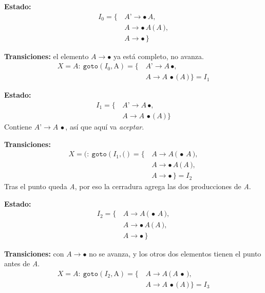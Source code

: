 \documentclass[12pt,letterpaper]{article}
\newcommand{\nt}[1]{\textit{#1}}
\newcommand{\tk}[1]{\texttt{#1}}
\newcommand{\tx}[1]{\text{#1}}
\begin{document}
\begin{enumerate}[label=\arabic*.]
  \medskip

  \textbf{Estado:}
  \[
  \begin{aligned}
    I_0 = \{\, & \nt{A'}\to\bullet\,\nt{A},\\
               & \nt{A}\to\bullet\,\nt{A}\,\tk{(}\,\nt{A}\,\tk{)},\\
               & \nt{A}\to\bullet\,\}
  \end{aligned}
  \]

  \textbf{Transiciones:} el elemento $\nt{A}\to\bullet$ ya está completo, no avanza.
  \[
  \begin{aligned}
    X=\nt{A}:\ \texttt{goto}(I_0,\tx{A}) = \{\, & \nt{A'}\to\nt{A}\,\bullet,\\
                                            & \nt{A}\to\nt{A}\,\bullet\,\tk{(}\,\nt{A}\,\tk{)}\,\} = \boxed{I_1}
  \end{aligned}
  \]

  \medskip

  \textbf{Estado:}
  \[
  \begin{aligned}
    I_1 = \{\, & \nt{A'}\to\nt{A}\,\bullet,\\
               & \nt{A}\to\nt{A}\,\bullet\,\tk{(}\,\nt{A}\,\tk{)}\,\}
  \end{aligned}
  \]
  Contiene $\nt{A'}\to\nt{A}\,\bullet$, así que aquí va \textit{aceptar}.

  \textbf{Transiciones:}
  \[
  \begin{aligned}
    X=\tk{(}:\ \texttt{goto}(I_1,\tk{(}) = \{\, & \nt{A}\to\nt{A}\,\tk{(}\,\bullet\,\nt{A}\,\tk{)},\\
                                              & \nt{A}\to\bullet\,\nt{A}\,\tk{(}\,\nt{A}\,\tk{)},\\
                                              & \nt{A}\to\bullet\,\} = \boxed{I_2}
  \end{aligned}
  \]
  Tras el punto queda \nt{A}, por eso la cerradura agrega las dos producciones de \nt{A}.

  \medskip

  \textbf{Estado:}
  \[
  \begin{aligned}
    I_2 = \{\, & \nt{A}\to\nt{A}\,\tk{(}\,\bullet\,\nt{A}\,\tk{)},\\
               & \nt{A}\to\bullet\,\nt{A}\,\tk{(}\,\nt{A}\,\tk{)},\\
               & \nt{A}\to\bullet\,\}
  \end{aligned}
  \]

  \textbf{Transiciones:} con $\nt{A}\to\bullet$ no se avanza, y los otros dos elementos tienen el punto antes
  de \nt{A}.
  \[
  \begin{aligned}
    X=\nt{A}:\ \texttt{goto}(I_2,\tx{A}) = \{\, & \nt{A}\to\nt{A}\,\tk{(}\,\nt{A}\,\bullet\,\tk{)},\\
                                            & \nt{A}\to\nt{A}\,\bullet\,\tk{(}\,\nt{A}\,\tk{)}\,\} = \boxed{I_3}
  \end{aligned}
  \]


\end{enumerate}
\end{document}
